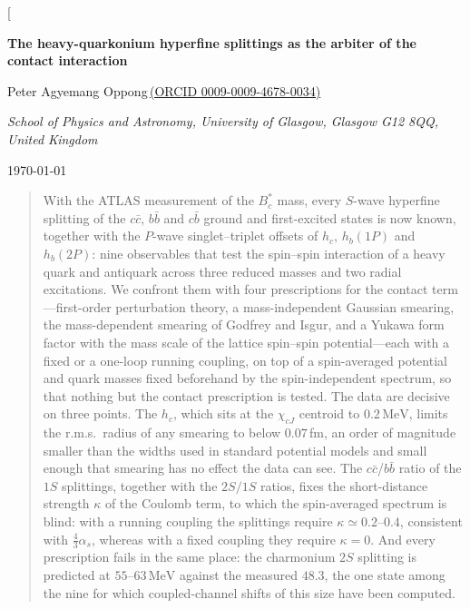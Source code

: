 \documentclass[10pt,twocolumn]{article}
\newcommand{\Bcs}{B_c^*}
\newcommand{\cc}{c\bar c}
\newcommand{\bb}{b\bar b}
\newcommand{\cb}{c\bar b}
\newcommand{\MeV}{\,\mathrm{MeV}}
\begin{document}
\twocolumn[
\begin{@twocolumnfalse}
\begin{center}
{\LARGE\bfseries The heavy-quarkonium hyperfine splittings as the arbiter of the contact interaction}

\vspace{10pt}
{\large Peter Agyemang Oppong\,\href{https://orcid.org/0009-0009-4678-0034}{\small(ORCID 0009-0009-4678-0034)}}

\vspace{2pt}
{\small\itshape School of Physics and Astronomy, University of Glasgow, Glasgow G12 8QQ, United Kingdom}

\vspace{2pt}
{\small \today}
\end{center}
\begin{quote}\small
With the ATLAS measurement of the $\Bcs$ mass, every $S$-wave hyperfine splitting of the $\cc$, $\bb$ and $\cb$ ground and first-excited states is now known, together with the $P$-wave singlet--triplet offsets of $h_c$, $h_b(1P)$ and $h_b(2P)$: nine observables that test the spin--spin interaction of a heavy quark and antiquark across three reduced masses and two radial excitations.
We confront them with four prescriptions for the contact term---first-order perturbation theory, a mass-independent Gaussian smearing, the mass-dependent smearing of Godfrey and Isgur, and a Yukawa form factor with the mass scale of the lattice spin--spin potential---each with a fixed or a one-loop running coupling, on top of a spin-averaged potential and quark masses fixed beforehand by the spin-independent spectrum, so that nothing but the contact prescription is tested.
The data are decisive on three points.
The $h_c$, which sits at the $\chi_{cJ}$ centroid to $0.2\MeV$, limits the r.m.s.\ radius of any smearing to below $0.07\,$fm, an order of magnitude smaller than the widths used in standard potential models and small enough that smearing has no effect the data can see.
The $\cc$/$\bb$ ratio of the $1S$ splittings, together with the $2S/1S$ ratios, fixes the short-distance strength $\kappa$ of the Coulomb term, to which the spin-averaged spectrum is blind: with a running coupling the splittings require $\kappa\simeq0.2$--$0.4$, consistent with $\tfrac43\alpha_s$, whereas with a fixed coupling they require $\kappa=0$.
And every prescription fails in the same place: the charmonium $2S$ splitting is predicted at $55$--$63\MeV$ against the measured $48.3$, the one state among the nine for which coupled-channel shifts of this size have been computed.

\end{quote}
\end{@twocolumnfalse}
\end{document}
